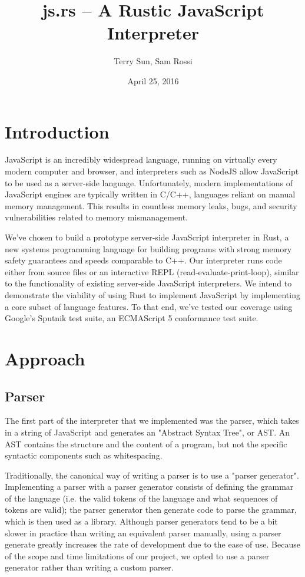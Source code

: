 \documentclass{article}
\title{js.rs -- A Rustic JavaScript Interpreter}
\date{April 25, 2016}
\author{Terry Sun, Sam Rossi}
\begin{document}
\maketitle

\section*{Introduction}

JavaScript is an incredibly widespread language, running on virtually every
modern computer and browser, and interpreters such as NodeJS allow JavaScript to
be used as a server-side language. Unfortunately, modern implementations of
JavaScript engines are typically written in C/C++, languages reliant on manual
memory management. This results in countless memory leaks, bugs, and security
vulnerabilities related to memory mismanagement. \newline

We’ve chosen to build a prototype server-side JavaScript interpreter in Rust, a
new systems programming language for building programs with strong memory safety
guarantees and speeds comparable to C++. Our interpreter runs code either from
source files or an interactive REPL (read-evaluate-print-loop), similar to the
functionality of existing server-side JavaScript interpreters. We intend to
demonstrate the viability of using Rust to implement JavaScript by implementing
a core subset of language features. To that end, we’ve tested our coverage using
Google’s Sputnik test suite, an ECMAScript 5 conformance test suite.

\section*{Approach}

\subsection*{Parser}

The first part of the interpreter that we implemented was the parser, which
takes in a string of JavaScript and generates an "Abstract Syntax Tree", or AST.
An AST contains the structure and the content of a program, but not the specific
syntactic components such as whitespacing. \newline

Traditionally, the canonical way of writing a parser is to use a "parser
generator". Implementing a parser with a parser generator consists of defining
the grammar of the language (i.e. the valid tokens of the language and what
sequences of tokens are valid); the parser generator then generate code to parse
the grammar, which is then used as a library. Although parser generators tend to
be a bit slower in practice than writing an equivalent parser manually, using
a parser generate greatly increases the rate of development due to the ease of
use. Because of the scope and time limitations of our project, we opted to use a
parser generator rather than writing a custom parser.
\end{document}
